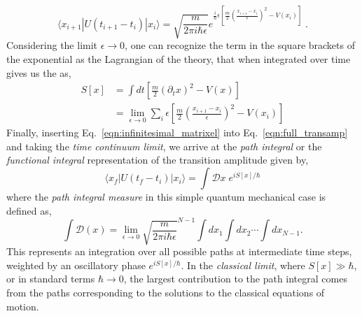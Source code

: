 \documentclass[11pt]{article}
\theoremstyle{definition}
\begin{document}
\begin{equation}\label{eqn:infinitesimal_matrixel}
  \langle x_{i+1} |U(t_{i+1}-t_i)| x_i \rangle = \sqrt{\frac{m}{2 \pi i \hbar \epsilon}} e^{ \frac{i}{\hbar}\epsilon \left[\frac{m}{2}\left(\frac{x_{i+1}-x_i}{\epsilon} \right)^2 - V(x_i) \right] } \;.
\end{equation}
Considering the limit $\epsilon \to 0$, one can recognize the term in the square brackets of the exponential as the Lagrangian of the theory, that when integrated over time gives us the  as,
\begin{align} \label{eqn:action}
S[x] &= \int dt \left[\frac{m}{2} (\partial_t x)^2 - V(x) \right] \\
&= \lim_{\epsilon \to 0} \sum_i \epsilon \left[\frac{m}{2}\left(\frac{x_{i+1}-x_i}{\epsilon} \right)^2 - V(x_i) \right] \nonumber
\end{align}
Finally, inserting Eq.~\eqref{eqn:infinitesimal_matrixel} into Eq.~\eqref{eqn:full_transamp} and taking the \textit{time continuum limit}, we arrive at the \textit{path integral} or the \textit{functional integral} representation of the transition amplitude given by,
\begin{equation}\label{eqn:real_PI}
\langle x_f |U(t_f-t_i)| x_i \rangle = \int \mathcal{D}x \; e^{i S[x]/\hbar}
\end{equation}
where the \textit{path integral measure} in this simple quantum mechanical case is defined as,
\begin{equation}
  \int \mathcal{D}(x) = \lim_{\epsilon \to 0} \sqrt{\frac{m}{2 \pi i \hbar \epsilon}}^{N-1} \int dx_1 \int dx_2 \cdots \int dx_{N-1}.
\end{equation}
This represents an integration over all possible paths at intermediate time steps, weighted by an oscillatory phase $e^{i S[x]/\hbar}$. In the \textit{classical limit}, where $S[x] \gg \hbar$, or in standard terms $\hbar \to 0$, the largest contribution to the path integral comes from the paths corresponding to the solutions to the classical equations of motion.
\end{document}
